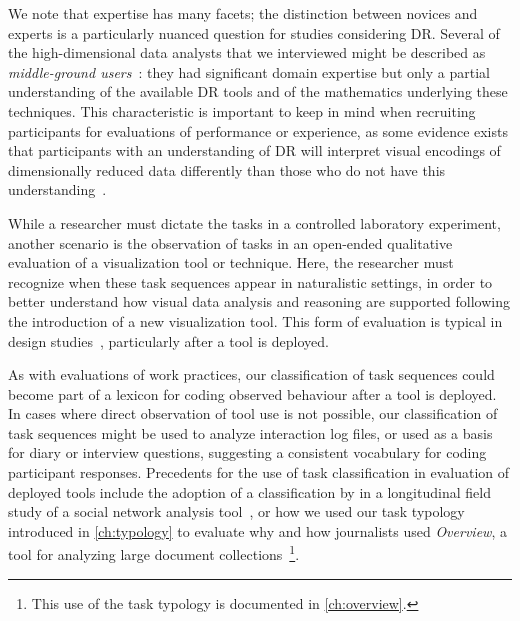 We note that expertise has many facets; the distinction between novices and experts is a particularly nuanced question for studies considering \ac{DR}.
Several of the high-dimensional data analysts that we interviewed might be described as {\it middle-ground users}~\cite{Ingram2010}: they had significant domain expertise but only a partial understanding of the available \ac{DR} tools and of the mathematics underlying these techniques. 
This characteristic is important to keep in mind when recruiting participants for evaluations of performance or experience, as some evidence exists that participants with an understanding of \ac{DR} will interpret visual encodings of dimensionally reduced data differently than those who do not have this understanding~\cite{Lewis2012}. 

While a researcher must dictate the tasks in a controlled laboratory experiment, another scenario is the observation of tasks in an open-ended qualitative evaluation of a visualization tool or technique.
Here, the researcher must recognize when these task sequences appear in naturalistic settings, in order to better understand how visual data analysis and reasoning are supported following the introduction of a new visualization tool.
This form of evaluation is typical in design studies~\cite{Sedlmair2012,Shneiderman2006}, particularly after a tool is deployed.

As with evaluations of work practices, our classification of task sequences could become part of a lexicon for coding observed behaviour after a tool is deployed.
In cases where direct observation of tool use is not possible, our classification of task sequences might be used to analyze interaction log files, or used as a basis for diary or interview questions, suggesting a consistent vocabulary for coding participant responses. 
Precedents for the use of task classification in evaluation of deployed tools include the adoption of a classification by \citet{Yi2007} in a longitudinal field study of a social network analysis tool~\cite{Perer2009}, or how we used our task typology introduced in \autoref{ch:typology} to evaluate why and how journalists used {\it Overview}, a tool for analyzing large document collections~\cite{Brehmer2014}\footnote{This use of the task typology is documented in \autoref{ch:overview}.}.

